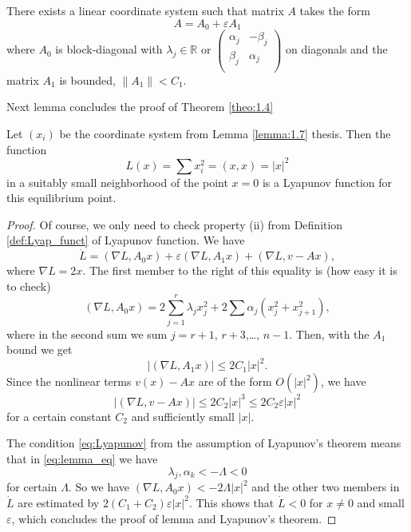 \begin{lemma}\label{lemma:1.7}
	There exists a linear coordinate system such that matrix $A$ takes the form
	$$A = A_0 + \varepsilon A_1$$
	where $A_0$ is block-diagonal with $\lambda_j \in \mathbb{R}$ or $\begin{pmatrix}
	\alpha_j & -\beta_j \\ 
	\beta_j& \alpha_j \\ \end{pmatrix}$ on diagonals and the matrix $A_1$ is bounded, $\left\|A_1\right\|<C_1$.
\end{lemma}

Next lemma concludes the proof of Theorem \ref{theo:1.4}
\begin{lemma}\label{lemma:2}
	Let $(x_i)$ be the coordinate system from Lemma \ref{lemma:1.7} thesis. Then the function
	$$L(x) = \sum x_i^2 = (x,x) = \left|x\right|^2$$
	in a suitably small neighborhood of the point $x= 0$ is a Lyapunov function for this equilibrium point.
	\begin{proof}
		Of course, we only need to check property (ii) from Definition \ref{def:Lyap_funct} of Lyapunov function. We have
		$$\dot{L} = (\nabla L, A_0x) + \varepsilon(\nabla L, A_1x) + (\nabla L, v-Ax),$$
		where $\nabla L = 2x$. The first member to the right of this equality is (how easy it is to check)
		\begin{equation}\label{eq:lemma_eq}
			(\nabla L, A_0x) = 2\sum_{j=1}^{r}\lambda_j x_j^2 + 2\sum \alpha_j(x_j^2+x_{j+1}^2),
		\end{equation}
		where in the second sum we sum $j = r + 1$, $r + 3$,\dots, $n - 1$. Then, with the $A_1$ bound we get
		$$\left|(\nabla L, A_1x)\right| \leq 2C_1\left|x\right|^2.$$
		Since the nonlinear terms $v (x) - Ax$ are of the form $O (\left|x\right| ^2)$, we have
		$$\left|(\nabla L, v-Ax)\right| \leq 2C_2\left|x\right|^3 \leq 2C_2\varepsilon \left|x\right|^2$$
		for a certain constant $C_2$ and sufficiently small $\left|x\right|$.
		
		The condition \eqref{eq:Lyapunov} from the assumption of Lyapunov's theorem means that in \eqref{eq:lemma_eq} we have
		$$\lambda_j, \alpha_k < - \Lambda < 0$$
		for certain $\Lambda$. So we have $(\nabla L, A_0x) < -2\Lambda \left|x\right|^2$ and the other two members in $\dot{L}$ are estimated by $2(C_1+C_2) \varepsilon \left|x\right|^2$. This shows that $\dot{L} <0$ for $x \neq 0$ and small $\varepsilon$, which concludes the proof of lemma and Lyapunov's theorem.
	\end{proof}
\end{lemma}

